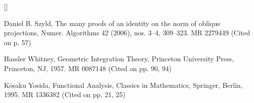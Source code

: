 \begin{list}{[]}{\setlength{\leftmargin}{2.7em}\setlength{\labelwidth}{2.2em}}
\item\label{bib:source-69}Daniel B. Szyld, The many proofs of an identity on the norm of oblique projections, Numer. Algorithms 42 (2006), nos. 3–4, 309–323. MR 2279449 (Cited on p. 57)

\item\label{bib:source-70}Hassler Whitney, Geometric Integration Theory, Princeton University Press, Princeton, NJ, 1957. MR 0087148 (Cited on pp. 90, 94)

\item\label{bib:source-71}Kōsaku Yosida, Functional Analysis, Classics in Mathematics, Springer, Berlin, 1995. MR 1336382 (Cited on pp. 21, 25)
\end{list}
